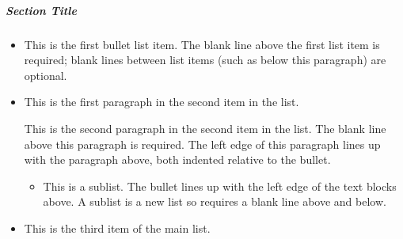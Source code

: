 \documentclass[letterpaper,10pt,english]{sphinxmanual}
\begin{document}
\subparagraph{Section Title}
\label{\detokenize{intro:id9}}\begin{itemize}
\item {} 
This is the first bullet list item.  The blank line above the
first list item is required; blank lines between list items
(such as below this paragraph) are optional.

\item {} 
This is the first paragraph in the second item in the list.

This is the second paragraph in the second item in the list.
The blank line above this paragraph is required.  The left edge
of this paragraph lines up with the paragraph above, both
indented relative to the bullet.
\begin{itemize}
\item {} 
This is a sublist.  The bullet lines up with the left edge of
the text blocks above.  A sublist is a new list so requires a
blank line above and below.

\end{itemize}

\item {} 
This is the third item of the main list.

\end{itemize}
\end{document}
